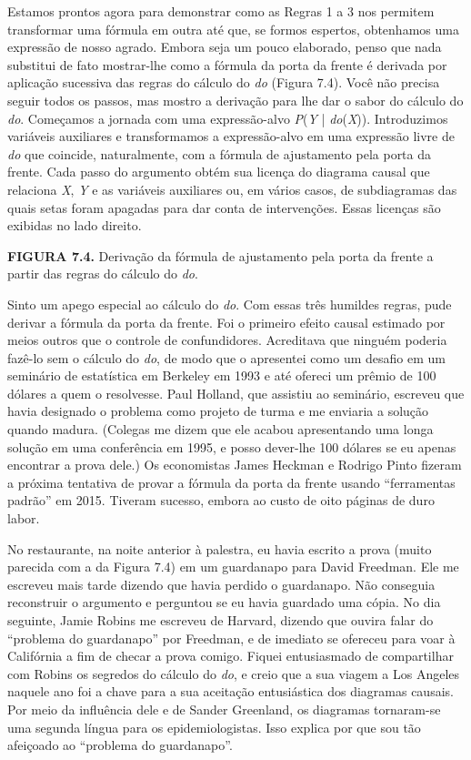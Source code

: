 \documentclass[11pt,a5paper,twoside]{book}
\begin{document}
Estamos prontos agora para demonstrar como as Regras 1 a 3 nos permitem transformar uma fórmula em outra até que, se formos espertos, obtenhamos uma expressão de nosso agrado. Embora seja um pouco elaborado, penso que nada substitui de fato mostrar-lhe como a fórmula da porta da frente é derivada por aplicação sucessiva das regras do cálculo do \textit{do} (Figura 7.4). Você não precisa seguir todos os passos, mas mostro a derivação para lhe dar o sabor do cálculo do \textit{do}. Começamos a jornada com uma expressão-alvo \textit{P}(\textit{Y} | \textit{do}(\textit{X})). Introduzimos variáveis auxiliares e transformamos a expressão-alvo em uma expressão livre de \textit{do} que coincide, naturalmente, com a fórmula de ajustamento pela porta da frente. Cada passo do argumento obtém sua licença do diagrama causal que relaciona \textit{X}, \textit{Y} e as variáveis auxiliares ou, em vários casos, de subdiagramas das quais setas foram apagadas para dar conta de intervenções. Essas licenças são exibidas no lado direito.

\textbf{FIGURA 7.4.} Derivação da fórmula de ajustamento pela porta da frente a partir das regras do cálculo do \textit{do}.

Sinto um apego especial ao cálculo do \textit{do}. Com essas três humildes regras, pude derivar a fórmula da porta da frente. Foi o primeiro efeito causal estimado por meios outros que o controle de confundidores. Acreditava que ninguém poderia fazê-lo sem o cálculo do \textit{do}, de modo que o apresentei como um desafio em um seminário de estatística em Berkeley em 1993 e até ofereci um prêmio de 100 dólares a quem o resolvesse. Paul Holland, que assistiu ao seminário, escreveu que havia designado o problema como projeto de turma e me enviaria a solução quando madura. (Colegas me dizem que ele acabou apresentando uma longa solução em uma conferência em 1995, e posso dever-lhe 100 dólares se eu apenas encontrar a prova dele.) Os economistas James Heckman e Rodrigo Pinto fizeram a próxima tentativa de provar a fórmula da porta da frente usando “ferramentas padrão” em 2015. Tiveram sucesso, embora ao custo de oito páginas de duro labor.

No restaurante, na noite anterior à palestra, eu havia escrito a prova (muito parecida com a da Figura 7.4) em um guardanapo para David Freedman. Ele me escreveu mais tarde dizendo que havia perdido o guardanapo. Não conseguia reconstruir o argumento e perguntou se eu havia guardado uma cópia. No dia seguinte, Jamie Robins me escreveu de Harvard, dizendo que ouvira falar do “problema do guardanapo” por Freedman, e de imediato se ofereceu para voar à Califórnia a fim de checar a prova comigo. Fiquei entusiasmado de compartilhar com Robins os segredos do cálculo do \textit{do}, e creio que a sua viagem a Los Angeles naquele ano foi a chave para a sua aceitação entusiástica dos diagramas causais. Por meio da influência dele e de Sander Greenland, os diagramas tornaram-se uma segunda língua para os epidemiologistas. Isso explica por que sou tão afeiçoado ao “problema do guardanapo”.
\end{document}
